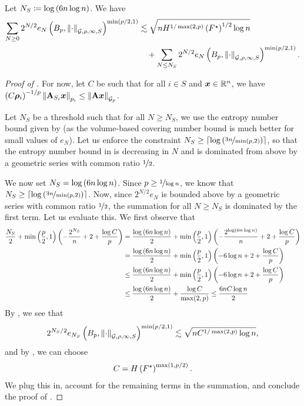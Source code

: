 \documentclass[11pt]{article}
\numberwithin{equation}{section}
\begin{document}
\begin{lemma}
\label{lemma:g2_tail}
Let $N_S \coloneqq \log\left(6n\log n\right)$. We have
\begin{align*}
    \sum_{N \ge 0} 2^{N/2}e_N\left(B_p, \left\lVert \cdot \right\rVert_{\mathcal{G},\rho,\infty, S}\right)^{\min(p/2,1)} &\lesssim \sqrt{nH^{1/\max(2,p)}\left(F^{\star}\right)^{1/2}\log n}\\
    &\quad+\sum_{N \le N_S} 2^{N/2}e_N\left(B_p, \left\lVert \cdot \right\rVert_{\mathcal{G},\rho,\infty, S}\right)^{\min(p/2,1)}.
\end{align*}
\end{lemma}
\begin{proof}[Proof of ]
For now, let $C$ be such that for all $i \in S$ and $\bm{x}\in\mathbb{R}^n$, we have $\left(C\bm{\rho}_i\right)^{-1/p}\left\lVert \mathbf{A}_{S_i}\bm{x} \right\rVert_{p_i} \le \left\lVert \mathbf{A}\bm{x} \right\rVert_{\mathcal{G}_{p}}$.

Let $N_S$ be a threshold such that for all $N \ge N_S$, we use the entropy number bound given by  (as the volume-based covering number bound is much better for small values of $e_N$). Let us enforce the constraint $N_S \ge \left\lceil \log\left(\nicefrac{3n}{\min(p,2)}\right) \right\rceil$, so that the entropy number bound in  is decreasing in $N$ and is dominated from above by a geometric series with common ratio $\nicefrac{1}{2}$.

We now set $N_S = \log\left(6n\log n\right)$. Since $p \ge \nicefrac{1}{\log n}$, we know that $N_S \ge \left\lceil \log\left(\nicefrac{3n}{\min(p,2)}\right) \right\rceil$. Now, since $2^{N/2}e_N$ is bounded above by a geometric series with common ratio $\nicefrac{1}{2}$, the summation for all $N \ge N_S$ is dominated by the first term. Let us evaluate this. We first observe that
\begin{align*}
    \frac{N_S}{2} + \min\left(\frac{p}{2},1\right)\left(-\frac{2^{N_S}}{n} + 2 + \frac{\log C}{p}\right) &= \frac{\log\left(6n\log n\right)}{2} + \min\left(\frac{p}{2},1\right)\left(-\frac{2^{\log\left(6n\log n\right)}}{n} + 2 +\frac{\log C}{p}\right) \\
    &= \frac{\log\left(6n\log n\right)}{2} + \min\left(\frac{p}{2},1\right)\left(-6\log n + 2 +\frac{\log C}{p}\right) \\
    &\le \frac{\log\left(6n\log n\right)}{2} + \min\left(\frac{p}{2},1\right)\left(-6\log n + 2 +\frac{\log C}{p}\right) \\
    &\le \frac{\log\left(6n\log n\right)}{2} + \frac{\log C}{\max(2,p)} \le \frac{6nC\log n}{2}
\end{align*}
By , we see that
\begin{align*}
    2^{N_S/2}e_{N_S}\left(B_p, \left\lVert \cdot \right\rVert_{\mathcal{G},\rho,\infty, S}\right)^{\min(p/2,1)} \lesssim \sqrt{nC^{1/\max(2,p)}\log n},
\end{align*}
and by , we can choose
\begin{align*}
    C = H\left(F^{\star}\right)^{\max(1,p/2)}.
\end{align*}
We plug this in, account for the remaining terms in the summation, and conclude the proof of .
\end{proof}
\end{document}
